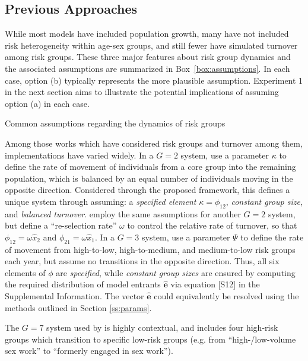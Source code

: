 \subsection{Previous Approaches}\label{ss:prev-approach}
While most models have included population growth,
many have not included risk heterogeneity within age-sex groups,
and still fewer have simulated turnover among risk groups.
These three major features about risk group dynamics and the associated assumptions
are summarized in Box~\ref{box:assumptions}.
In each case, option (b) typically represents the more plausible assumption.
Experiment 1 in the next section
aims to illustrate the potential implications of assuming option (a) in each case.
\begin{floatbox}
  \caption{Common assumptions regarding the dynamics of risk groups}
  \label{box:assumptions}
  
\end{floatbox}
\par
Among those works which have considered risk groups and turnover among them,
implementations have varied widely.
In a $G = 2$ system,
\citet{Stigum1994} use a parameter $\kappa$ to define
the rate of movement of individuals from a core group into the remaining population,
which is balanced by an equal number of individuals moving in the opposite direction.
Considered through the proposed framework,
this defines a unique system through assuming:
a \emph{specified element} $\kappa = \phi_{12}$,
\emph{constant group size}, and \emph{balanced turnover}.
\citet{Henry2015} employ the same assumptions for another $G = 2$ system,
but define a ``re-selection rate'' $\omega$ to control
the relative rate of turnover, so that
$\phi_{12} = \omega \hat{x}_{2}$ and $\phi_{21} = \omega \hat{x}_{1}$.
In a $G = 3$ system,
\citet{Eaton2014} use a parameter $\Psi$ to define the rate of movement from
high-to-low, high-to-medium, and medium-to-low risk groups each year,
but assume no transitions in the opposite direction.
Thus, all six elements of $\phi$ are \emph{specified},
while \emph{constant group sizes} are ensured by computing
the required distribution of model entrants $\bm{\hat{e}}$
via equation [S12] in the Supplemental Information.
The vector $\bm{\hat{e}}$ could equivalently be resolved using
the methods outlined in Section \ref{ss:params}.
\par
The $G = 7$ system used by
\citet{Boily2015} is highly contextual, and
includes four high-risk groups which transition to specific low-risk groups
(e.g. from ``high-/low-volume sex work'' to ``formerly engaged in sex work'').
